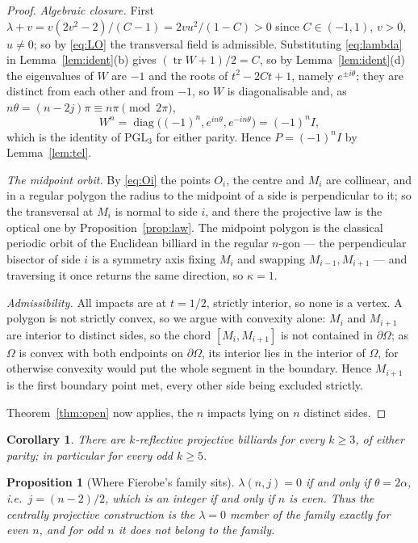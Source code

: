 \documentclass[11pt,a4paper]{article}
\theoremstyle{plain}
\newtheorem{proposition}[theorem]{Proposition}
\newtheorem{corollary}[theorem]{Corollary}
\theoremstyle{definition}
\theoremstyle{remark}
\newcommand{\PGL}{\mathrm{PGL}}
\newcommand{\tr}{\operatorname{tr}}
\begin{document}
\begin{proof}
\emph{Algebraic closure.} First
$\lambda+v=v(2v^2-2)/(C-1)=2vu^2/(1-C)>0$ since $C\in(-1,1)$, $v>0$, $u\neq0$; so
by \eqref{eq:LO} the transversal field is admissible. Substituting
\eqref{eq:lambda} in Lemma~\ref{lem:ident}(b) gives $(\tr W+1)/2=C$, so by
Lemma~\ref{lem:ident}(d) the eigenvalues of $W$ are $-1$ and the roots of
$t^2-2Ct+1$, namely $e^{\pm i\theta}$; they are distinct from each other and from
$-1$, so $W$ is diagonalisable and, as $n\theta=(n-2j)\pi\equiv n\pi\pmod{2\pi}$,
\[
  W^n=\operatorname{diag}\bigl((-1)^n,e^{in\theta},e^{-in\theta}\bigr)=(-1)^nI ,
\]
which is the identity of $\PGL_3$ for either parity. Hence $P=(-1)^nI$ by
Lemma~\ref{lem:tel}.

\emph{The midpoint orbit.} By \eqref{eq:Oi} the points $O_i$, the centre and $M_i$
are collinear, and in a regular polygon the radius to the midpoint of a side is
perpendicular to it; so the transversal at $M_i$ is normal to side $i$, and there
the projective law is the optical one by Proposition~\ref{prop:law}. The midpoint
polygon is the classical periodic orbit of the Euclidean billiard in the regular
$n$-gon --- the perpendicular bisector of side $i$ is a symmetry axis fixing $M_i$
and swapping $M_{i-1},M_{i+1}$ --- and traversing it once returns the same
direction, so $\kappa=1$.

\emph{Admissibility.} All impacts are at $t=1/2$, strictly interior, so none is a
vertex. A polygon is not strictly convex, so we argue with convexity alone: $M_i$
and $M_{i+1}$ are interior to distinct sides, so the chord $[M_i,M_{i+1}]$ is not
contained in $\partial\Omega$; as $\Omega$ is convex with both endpoints on
$\partial\Omega$, its interior lies in the interior of $\Omega$, for otherwise
convexity would put the whole segment in the boundary. Hence $M_{i+1}$ is the first
boundary point met, every other side being excluded strictly.

Theorem~\ref{thm:open} now applies, the $n$ impacts lying on $n$ distinct sides.
\end{proof}

\begin{corollary}
There are $k$-reflective projective billiards for every $k\ge3$, of either parity;
in particular for every odd $k\ge5$.
\end{corollary}

\begin{proposition}[Where Fierobe's family sits]\label{prop:fierobe}
$\lambda(n,j)=0$ if and only if $\theta=2\alpha$, i.e.\ $j=(n-2)/2$, which is an
integer if and only if $n$ is even. Thus the centrally projective construction is
the $\lambda=0$ member of the family exactly for even $n$, and for odd $n$ it does
not belong to the family.
\end{proposition}
\end{document}

